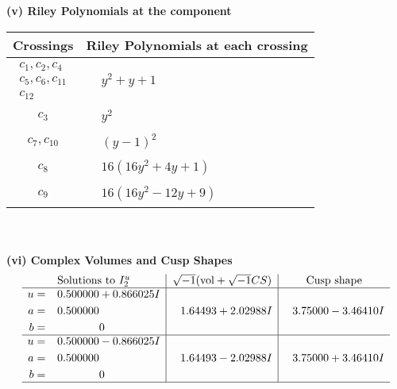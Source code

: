 \documentclass[1p]{elsarticle_modified}
\theoremstyle{definition}
\newcommand{\I}{\sqrt{-1}}
\begin{document}
\newpage\renewcommand{\arraystretch}{1}
\flushleft \textbf{(v) Riley Polynomials at the component}\newline \\
\begin{tabular}{m{50pt}|m{274pt}}
Crossings & \hspace{64pt}Riley Polynomials at each crossing \\
\hline $$\begin{aligned}c_{1},c_{2},c_{4}\\c_{5},c_{6},c_{11}\\c_{12}\end{aligned}$$&$\begin{aligned}
&y^2+y+1
\end{aligned}$\\
\hline $$\begin{aligned}c_{3}\end{aligned}$$&$\begin{aligned}
&y^2
\end{aligned}$\\
\hline $$\begin{aligned}c_{7},c_{10}\end{aligned}$$&$\begin{aligned}
&(y-1)^2
\end{aligned}$\\
\hline $$\begin{aligned}c_{8}\end{aligned}$$&$\begin{aligned}
&16(16 y^2+4 y+1)
\end{aligned}$\\
\hline $$\begin{aligned}c_{9}\end{aligned}$$&$\begin{aligned}
&16(16 y^2-12 y+9)
\end{aligned}$\\
\hline
\end{tabular}\\~\\
\newpage\flushleft \textbf{(vi) Complex Volumes and Cusp Shapes}
$$\begin{array}{c|c|c}  
\text{Solutions to }I^u_{2}& \I (\text{vol} + \sqrt{-1}CS) & \text{Cusp shape}\\
 \hline 
\begin{aligned}
u &= \phantom{-}0.500000 + 0.866025 I \\
a &= \phantom{-}0.500000\phantom{ +0.000000I} \\
b &= \phantom{-0.000000 } 0\end{aligned}
 & \phantom{-}1.64493 + 2.02988 I & \phantom{-}3.75000 - 3.46410 I \\ \hline\begin{aligned}
u &= \phantom{-}0.500000 - 0.866025 I \\
a &= \phantom{-}0.500000\phantom{ +0.000000I} \\
b &= \phantom{-0.000000 } 0\end{aligned}
 & \phantom{-}1.64493 - 2.02988 I & \phantom{-}3.75000 + 3.46410 I\\
 \hline 
 \end{array}$$\newpage
\end{document}
